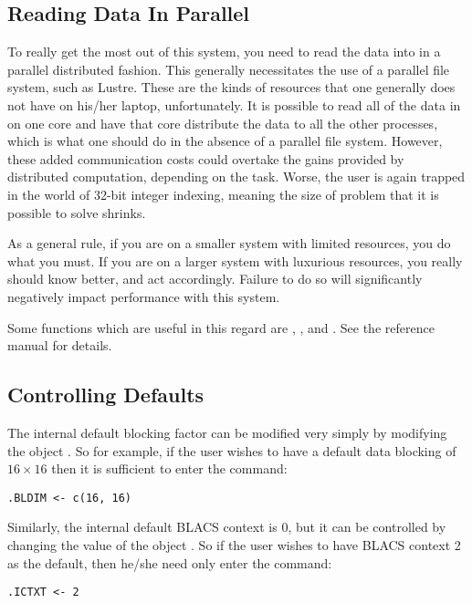 \subsection{Reading Data In Parallel}

To really get the most out of this system, you need to read the data into  in a parallel distributed fashion.  This generally necessitates the use of a parallel file system, such as Lustre.  These are the kinds of resources that one generally does not have on his/her laptop, unfortunately.  It is possible to read all of the data in on one core and have that core distribute the data to all the other processes, which is what one should do in the absence of a parallel file system.  However, these added communication costs could  overtake the gains provided by distributed computation, depending on the task.  Worse, the user is again trapped in the world of 32-bit integer indexing, meaning the size of problem that it is possible to solve shrinks.

As a general rule, if you are on a smaller system with limited resources, you do what you must.  If you are on a larger system with luxurious resources, you really should know better, and act accordingly.  Failure to do so will significantly negatively impact performance with this system.

Some functions which are useful in this regard are , , and .  See the reference manual for details.





\subsection{Controlling Defaults}

The internal default blocking factor can be modified very simply by modifying the object .  So for example, if the user wishes to have a default data blocking of $16\times 16$ then it is sufficient to enter the command:
\begin{lstlisting}[language=rr]
.BLDIM <- c(16, 16)
\end{lstlisting}

Similarly, the internal default BLACS context is 0, but it can be controlled by changing the value of the object .  So if the user wishes to have BLACS context 2 as the default, then he/she need only enter the command:
\begin{lstlisting}[language=rr]
.ICTXT <- 2
\end{lstlisting}
